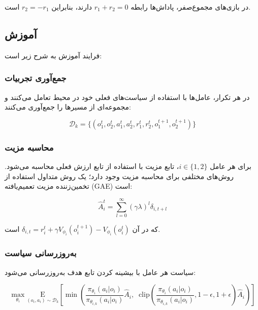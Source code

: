 در بازی‌های مجموع­‌صفر، پاداش‌ها رابطه $r_1 + r_2 = 0$ دارند، بنابراین $r_2 = -r_1$ است.

\subsection{آموزش }

فرایند آموزش  به شرح زیر است:

\subsubsection{جمع‌آوری تجربیات}

در هر تکرار، عامل‌ها با استفاده از سیاست‌های فعلی خود در محیط تعامل می‌کنند و مجموعه‌ای از مسیرها را جمع‌آوری می‌کنند:

\begin{equation}
    \mathcal{D}_k = \{(o_1^t, o_2^t, a_1^t, a_2^t, r_1^t, r_2^t, o_1^{t+1}, o_2^{t+1})\}
\end{equation}

\subsubsection{محاسبه مزیت}

برای هر عامل $i \in \{1, 2\}$، تابع مزیت با استفاده از تابع ارزش فعلی محاسبه می‌شود. روش‌های مختلفی برای محاسبه مزیت وجود دارد؛ یک روش متداول استفاده از تخمین‌زننده مزیت تعمیم‌یافته (GAE) است:

\begin{equation}
    \hat{A}_i^t = \sum_{l=0}^{\infty} (\gamma\lambda)^l \delta_{i,t+l}
\end{equation}

که در آن $\delta_{i,t} = r_i^t + \gamma V_{\phi_i}(o_i^{t+1}) - V_{\phi_i}(o_i^t)$ است.

\subsubsection{به‌روزرسانی سیاست}

سیاست هر عامل با بیشینه کردن تابع هدف  به‌روزرسانی می‌شود:

\begin{equation}
    \max_{\theta_i} \underset{(o_i,a_i) \sim \mathcal{D}_k}{\mathrm{E}}\left[ \min\left( \frac{\pi_{\theta_i}(a_i|o_i)}{\pi_{\theta_{i,k}}(a_i|o_i)} \hat{A}_i, \;\; \text{clip}\left(\frac{\pi_{\theta_i}(a_i|o_i)}{\pi_{\theta_{i,k}}(a_i|o_i)}, 1 - \epsilon, 1+\epsilon \right) \hat{A}_i \right) \right]
\end{equation}

